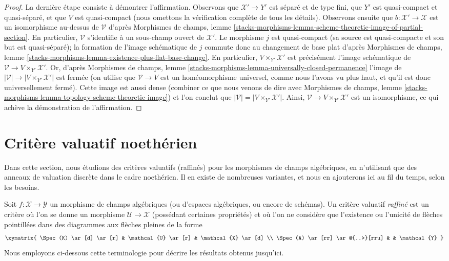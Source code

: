 \begin{proof}
\medskip\noindent
La dernière étape consiste à démontrer l'affirmation.
Observons que $\mathcal{X}' \to Y'$ est séparé et de type fini,
que $Y'$ est quasi-compact et quasi-séparé, et que $V$ est quasi-compact
(nous omettons la vérification complète de tous les détails).
Observons ensuite que
$b : \mathcal{X}' \to \mathcal{X}$ est un isomorphisme au-dessus de
$\mathcal{V}$ d'après Morphismes de champs, lemme
\ref{stacks-morphisms-lemma-scheme-theoretic-image-of-partial-section}.
En particulier, $\mathcal{V}$ s'identifie à un sous-champ ouvert
de $\mathcal{X}'$.
Le morphisme $j$ est quasi-compact
(sa source est quasi-compacte et son but est quasi-séparé); la formation
de l'image schématique de $j$ commute donc au changement de base plat d'après
Morphismes de champs, lemme
\ref{stacks-morphisms-lemma-existence-plus-flat-base-change}.
En particulier, $V \times_{Y'} \mathcal{X}'$ est précisément
l'image schématique de
$\mathcal{V} \to V \times_{Y'} \mathcal{X}'$.
Or, d'après Morphismes de champs, lemme
\ref{stacks-morphisms-lemma-universally-closed-permanence}
l'image de $|\mathcal{V}| \to |V \times_{Y'} \mathcal{X}'|$
est fermée (on utilise que $\mathcal{V} \to V$ est un homéomorphisme universel,
comme nous l'avons vu plus haut, et qu'il est donc universellement fermé).
Cette image est aussi dense (combiner ce que nous venons de dire avec
Morphismes de champs, lemme
\ref{stacks-morphisms-lemma-topology-scheme-theoretic-image})
et l'on conclut que $|\mathcal{V}| = |V \times_{Y'} \mathcal{X}'|$.
Ainsi, $\mathcal{V} \to V \times_{Y'} \mathcal{X}'$ est un
isomorphisme, ce qui achève la démonstration de l'affirmation.
\end{proof}




\section{Critère valuatif noethérien}
\label{section-Noetherian-valuative-criterion}

\noindent
Dans cette section, nous étudions des critères valuatifs (raffinés) pour les
morphismes de champs algébriques, en n'utilisant que des anneaux de valuation discrète
dans le cadre noethérien. Il en existe de nombreuses variantes,
et nous en ajouterons ici au fil du temps, selon les besoins.

\medskip\noindent
Soit $f : \mathcal{X} \to \mathcal{Y}$ un morphisme de champs algébriques
(ou d'espaces algébriques, ou encore de schémas). Un critère valuatif {\it raffiné}
est un critère où l'on se donne un morphisme $\mathcal{U} \to \mathcal{X}$
(possédant certaines propriétés) et où l'on ne considère que l'existence ou l'unicité
de flèches pointillées dans des diagrammes aux flèches pleines de la forme
$$
\xymatrix{
\Spec(K) \ar[d] \ar[r] & \mathcal{U} \ar[r] & \mathcal{X} \ar[d] \\
\Spec(A) \ar[rr] \ar@{..>}[rru] & & \mathcal{Y}
}
$$
Nous employons ci-dessous cette terminologie pour décrire les résultats obtenus jusqu'ici.

